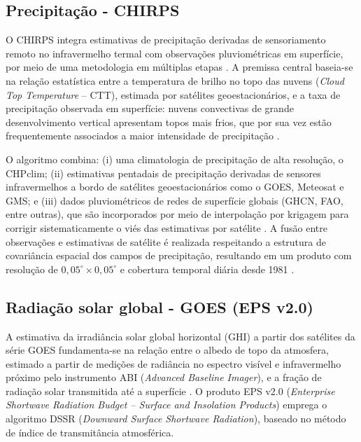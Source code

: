\subsection{Precipitação - CHIRPS}

O CHIRPS integra estimativas de precipitação derivadas de sensoriamento remoto no infravermelho 
termal com observações pluviométricas em superfície, por meio de uma metodologia em múltiplas etapas \citep{funk2015}. A premissa central baseia-se na relação estatística entre a temperatura de brilho no topo das nuvens (\textit{Cloud Top Temperature} -- CTT), estimada por satélites geoestacionários, e a taxa de precipitação observada em superfície: nuvens convectivas de grande desenvolvimento vertical apresentam topos mais frios, que por sua vez estão frequentemente associados a maior intensidade de precipitação \citep{joyce2004cmorph}.

O algoritmo combina: (i) uma climatologia de precipitação de alta resolução, o CHPclim; (ii) estimativas pentadais de precipitação derivadas de sensores infravermelhos 
a bordo de satélites geoestacionários como o GOES, Meteosat e GMS; e (iii) dados pluviométricos de redes de superfície globais (GHCN, FAO, entre outras), que são incorporados por meio de interpolação por krigagem para corrigir sistematicamente o viés das estimativas por satélite \citep{funk2015}. A fusão entre observações e 
estimativas de satélite é realizada respeitando a estrutura de covariância espacial dos campos de precipitação, resultando em um produto com resolução de $0{,}05^\circ \times 0{,}05^\circ$ e cobertura temporal diária desde 1981 \citep{harrison2022chirps}.

\subsection{Radiação solar global - GOES (EPS v2.0)}

A estimativa da irradiância solar global horizontal (GHI) a partir dos satélites da série GOES fundamenta-se na relação entre o albedo de topo da atmosfera, estimado a 
partir de medições de radiância no espectro visível e infravermelho próximo pelo instrumento ABI (\textit{Advanced Baseline Imager}), e a fração de radiação solar transmitida até a superfície \citep{laszlo2020}. O produto EPS v2.0 (\textit{Enterprise Shortwave Radiation Budget -- Surface and Insolation Products}) emprega o algoritmo DSSR (\textit{Downward Surface Shortwave Radiation}), baseado no método de índice de transmitância atmosférica.

